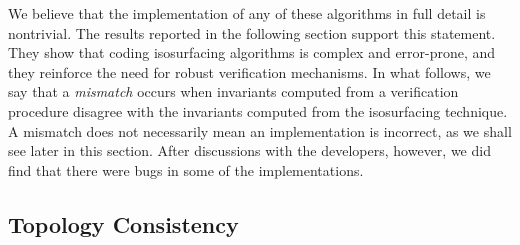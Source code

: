 We believe that the implementation of any of these algorithms in full
detail is nontrivial. The results reported in the following section
support this statement. They show that coding isosurfacing algorithms
is complex and error-prone, and they reinforce the need for robust
verification mechanisms.
In what follows, we say that a \emph{mismatch} occurs when invariants
computed from a verification procedure disagree with the invariants
computed from the isosurfacing technique.  A mismatch does not
necessarily mean an implementation is incorrect, as we shall see later
in this section.  After discussions with the developers, however, we
did find that there were bugs in some of the implementations.

\subsection{Topology Consistency}
\label{sec:consistency}


